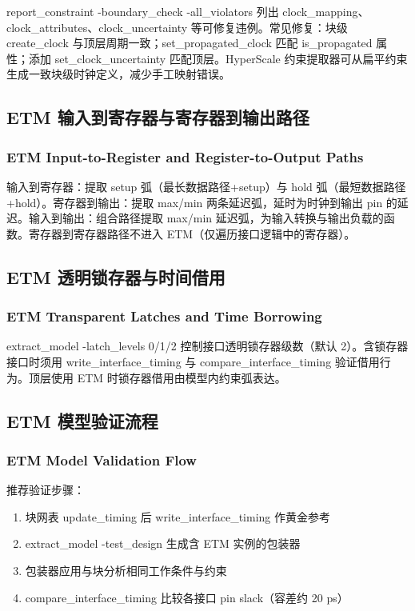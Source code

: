 report_constraint -boundary_check -all_violators 列出 clock_mapping、clock_attributes、clock_uncertainty 等可修复违例。常见修复：块级 create_clock 与顶层周期一致；set_propagated_clock 匹配 is_propagated 属性；添加 set_clock_uncertainty 匹配顶层。HyperScale 约束提取器可从扁平约束生成一致块级时钟定义，减少手工映射错误。

\subsection{ETM 输入到寄存器与寄存器到输出路径}
\subsubsection*{ETM Input-to-Register and Register-to-Output Paths}

输入到寄存器：提取 setup 弧（最长数据路径+setup）与 hold 弧（最短数据路径+hold）。寄存器到输出：提取 max/min 两条延迟弧，延时为时钟到输出 pin 的延迟。输入到输出：组合路径提取 max/min 延迟弧，为输入转换与输出负载的函数。寄存器到寄存器路径不进入 ETM（仅遍历接口逻辑中的寄存器）。

\subsection{ETM 透明锁存器与时间借用}
\subsubsection*{ETM Transparent Latches and Time Borrowing}

extract_model -latch_levels 0/1/2 控制接口透明锁存器级数（默认 2）。含锁存器接口时须用 write_interface_timing 与 compare_interface_timing 验证借用行为。顶层使用 ETM 时锁存器借用由模型内约束弧表达。

\subsection{ETM 模型验证流程}
\subsubsection*{ETM Model Validation Flow}

推荐验证步骤：
\begin{enumerate}
  \item 块网表 update\_timing 后 write\_interface\_timing 作黄金参考
  \item extract\_model -test\_design 生成含 ETM 实例的包装器
  \item 包装器应用与块分析相同工作条件与约束
  \item compare\_interface\_timing 比较各接口 pin slack（容差约 20 ps）
\end{enumerate}

